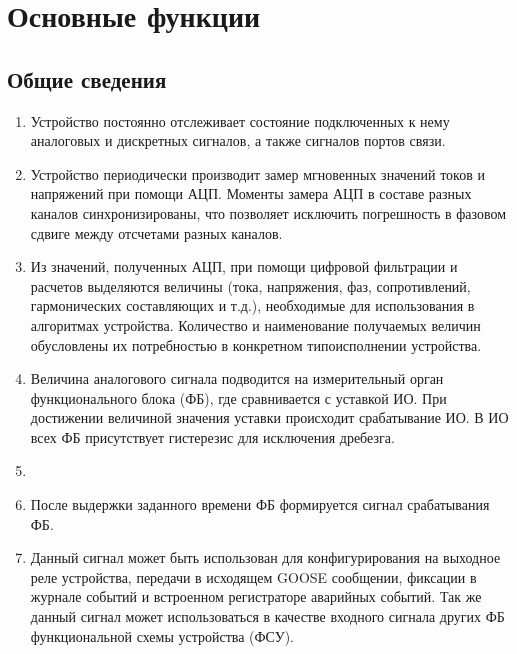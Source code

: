 
{\color{unimain}\section[Основные функции]{Основные функции}\label{sec:funcs}}

{\color{unimain}\subsection{Общие сведения}}

\begin{enumerate}
\item Устройство постоянно отслеживает состояние подключенных к нему аналоговых и дискретных сигналов, а также сигналов портов связи.
\item Устройство периодически производит замер мгновенных значений токов и напряжений при помощи АЦП. Моменты замера АЦП в составе разных каналов синхронизированы, что позволяет исключить погрешность в фазовом сдвиге между отсчетами разных каналов.
\item Из значений, полученных АЦП, при помощи цифровой фильтрации и расчетов выделяются величины (тока, напряжения, фаз, сопротивлений, гармонических составляющих и т.д.), необходимые для использования в алгоритмах устройства. Количество и наименование получаемых величин обусловлены их потребностью в конкретном типоисполнении устройства.
\item Величина аналогового сигнала подводится на измерительный орган функционального блока (ФБ), где сравнивается с уставкой ИО. При достижении величиной значения уставки происходит срабатывание ИО. В ИО всех ФБ присутствует гистерезис для исключения дребезга.
\item {}
\item После выдержки заданного времени ФБ формируется сигнал срабатывания ФБ.
\item Данный сигнал может быть использован для конфигурирования на выходное реле устройства, передачи в исходящем GOOSE сообщении, фиксации в журнале событий и встроенном регистраторе аварийных событий. Так же данный сигнал может использоваться в качестве входного сигнала других ФБ функциональной схемы устройства (ФСУ).

\end{enumerate}
